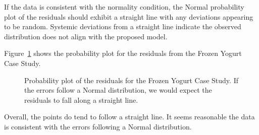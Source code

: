 \documentclass[
  letterpaper,
  DIV=11,
  numbers=noendperiod]{scrreprt}
\theoremstyle{definition}
\theoremstyle{definition}
\theoremstyle{plain}
\theoremstyle{remark}
\begin{document}
\begin{tcolorbox}[enhanced jigsaw, colbacktitle=quarto-callout-note-color!10!white, colback=white, left=2mm, title=\textcolor{quarto-callout-note-color}{\faInfo}\hspace{0.5em}{Graphically Assessing the Normality Condition}, toptitle=1mm, leftrule=.75mm, breakable, bottomrule=.15mm, arc=.35mm, rightrule=.15mm, toprule=.15mm, coltitle=black, opacityback=0, colframe=quarto-callout-note-color-frame, opacitybacktitle=0.6, bottomtitle=1mm, titlerule=0mm]

If the data is consistent with the normality condition, the Normal
probability plot of the residuals should exhibit a straight line with
any deviations appearing to be random. Systemic deviations from a
straight line indicate the observed distribution does not align with the
proposed model.

\end{tcolorbox}

Figure~\ref{fig-blockassessment-normal-yogurt} shows the probability
plot for the residuals from the Frozen Yogurt Case Study.

\begin{figure}


\caption{\label{fig-blockassessment-normal-yogurt}Probability plot of
the residuals for the Frozen Yogurt Case Study. If the errors follow a
Normal distribution, we would expect the residuals to fall along a
straight line.}

\end{figure}%

Overall, the points do tend to follow a straight line. It seems
reasonable the data is consistent with the errors following a Normal
distribution.
\end{document}
